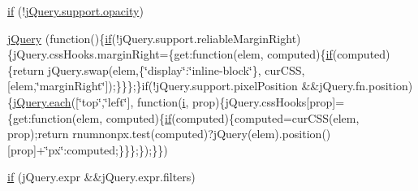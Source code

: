 \begin{DoxyCompactItemize}
\item 
\hyperlink{obj_2_release_2_package_2_package_tmp_2_scripts_2jquery-1_810_82_8js_abc7375d3165b805c35ce8ca2e1a31e81}{if} (!\hyperlink{_scripts_2jquery-1_810_82_8min_8js_a328c19d9255bfd09a2f3cddecadca6ad}{j\+Query.\+support.\+opacity})
\item 
\hyperlink{obj_2_release_2_package_2_package_tmp_2_scripts_2jquery-1_810_82_8js_a5e01048fbd3a30b44e8d491d8945c457}{j\+Query} (function()\{\hyperlink{_scripts_2respond_8min_8js_a93851d60dd037a83509a1757b9ee7b66}{if}(!j\+Query.\+support.\+reliable\+Margin\+Right)\{j\+Query.\+css\+Hooks.\+margin\+Right=\{get\+:function(elem, computed)\{\hyperlink{_scripts_2respond_8min_8js_a93851d60dd037a83509a1757b9ee7b66}{if}(computed)\{return j\+Query.\+swap(elem,\{\char`\"{}display\char`\"{}\+:\char`\"{}inline-\/block\char`\"{}\}, cur\+C\+S\+S, \mbox{[}elem,\char`\"{}margin\+Right\char`\"{}\mbox{]});\}\}\};\}if(!j\+Query.\+support.\+pixel\+Position \&\&j\+Query.\+fn.\+position)\{\hyperlink{_scripts_2jquery-1_810_82_8min_8js_af24c9ea1e34372f8c8b312b35586008d}{j\+Query.\+each}(\mbox{[}\char`\"{}top\char`\"{},\char`\"{}left\char`\"{}\mbox{]}, function(\hyperlink{jquery_8unobtrusive-ajax_8min_8js_a84da5ff1aa6008a770fb28040f6b0569}{i}, prop)\{j\+Query.\+css\+Hooks\mbox{[}prop\mbox{]}=\{get\+:function(elem, computed)\{\hyperlink{_scripts_2respond_8min_8js_a93851d60dd037a83509a1757b9ee7b66}{if}(computed)\{computed=cur\+C\+S\+S(elem, prop);return rnumnonpx.\+test(computed)?j\+Query(elem).position()\mbox{[}prop\mbox{]}+\char`\"{}px\char`\"{}\+:computed;\}\}\};\});\}\})
\item 
\hyperlink{obj_2_release_2_package_2_package_tmp_2_scripts_2jquery-1_810_82_8js_a0335a19470806a284d8c38df8f5b5718}{if} (j\+Query.\+expr \&\&j\+Query.\+expr.\+filters)
\item 

\end{DoxyCompactItemize}
